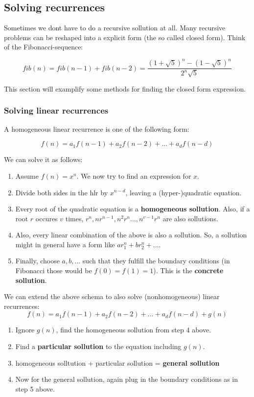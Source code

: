 \subsection{Solving recurrences}
Sometimes we dont have to do a recursive sollution at all. Many recursive problems can be reshaped into a explicit form (the so called closed form). Think of the Fibonacci-sequence: 

$$ fib(n) = fib(n-1) + fib(n-2) = \frac{(1 + \sqrt{5})^n - (1 - \sqrt{5})^n }{2^n \sqrt{5}} $$

This section will examplify some methods for finding the closed form expression.

\subsubsection{Solving linear recurrences}

A homogeneous linear recurrence is one of the following form: 

$$ f(n) = a_1 f(n-1) + a_2 f(n-2) + ... + a_d f(n-d)$$

We can solve it as follows: 

\begin{enumerate}
    \item Assume $f(n) = x^n$. We now try to find an expression for $x$.
    \item Divide both sides in the hlr by $x^{n-d}$, leaving a (hyper-)quadratic equation. 
    \item Every root of the quadratic equation is a \textbf{homogeneous sollution}. Also, if a root $r$ occures $v$ times, $r^n, nr^{n-1}, n^2r^n ..., n^{v-1}r^n$ are also sollutions.
    \item Also, every linear combination of the above is also a sollution. So, a sollution might in general have a form like $a r_1^n + b r_2^n + ...$.
    \item Finally, choose $a, b, ...$ such that they fulfill the boundary conditions (in Fibonacci those would be $f(0) = f(1) = 1$). This is the \textbf{concrete sollution}.
\end{enumerate}

We can extend the above schema to also solve (nonhomogeneous) linear recurrences: 
$$ f(n) = a_1 f(n-1) + a_2 f(n-2) + ... + a_d f(n-d) + g(n)$$

\begin{enumerate}
    \item Ignore $g(n)$, find the homogeneous sollution from step 4 above.
    \item Find a \textbf{particular sollution} to the equation including $g(n)$.
    \item homogeneous solltution + particular sollution = \textbf{general sollution}
    \item Now for the general sollution, again plug in the boundary conditions as in step 5 above.
\end{enumerate}


